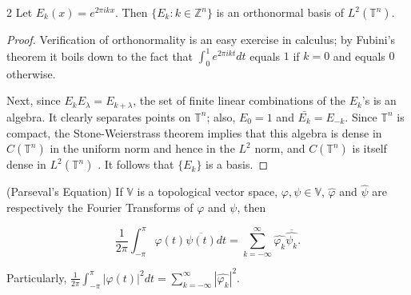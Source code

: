 \begin{theorem}{2 \cite{folland2013real}}
Let $E_{k}(x) = e^{2 \pi i k x}$. Then $\{E_{k} : k \in \mathbb{Z}^{n}\}$ is an orthonormal basis of $L^{2}(\mathbb{T}^{n})$.

\begin{proof}

Verification of orthonormality is an easy exercise in calculus; by Fubini's theorem it boils down to the fact that $\int_{0}^{1}e^{2 \pi i k t}dt$ equals $1$ if $k = 0$ and equals $0$ otherwise.

Next, since $E_{k}E_{\lambda} = E_{k + \lambda}$, the set of finite linear combinations of the $E_{k}$'s is an algebra. It clearly separates points on $\mathbb{T}^{n}$; also, $E_{0} = 1$ and $\bar{E_{k}} = E_{-k}$. Since $\mathbb{T}^{n}$ is compact, the Stone-Weierstrass theorem implies that this algebra is dense in $C(\mathbb{T}^{n})$ in the uniform norm and hence in the $L^{2}$ norm, and $C(\mathbb{T}^{n})$ is itself dense in $L^{2}(\mathbb{T}^{n})$
. It follows that $\{E_{k}\}$ is a basis.

\end{proof}
\end{theorem}
\vspace{0.1in}

\begin{definition}{(Parseval's Equation) \cite{garling2014course}}
If $\mathbb{V}$ is a topological vector space, $\varphi, \psi \in \mathbb{V}$, $\hat{\varphi}$ and $\hat{\psi}$ are respectively the Fourier Transforms of $\varphi$ and $\psi$, then

\[
    \frac{1}{2 \pi} 
    \int_{-\pi}^{\pi} \varphi(t) \overline{\psi(t)}dt = 
    \sum_{k=-\infty}^{\infty} \hat{\varphi_{k}} \overline{\hat{\psi_{k}}}.
\]

\noindent Particularly, $\frac{1}{2 \pi} \int_{-\pi}^{\pi} |\varphi(t)|^{2} dt = \sum_{k=-\infty}^{\infty} |\hat{\varphi_{k}}|^{2}$.

\end{definition}
\vspace{0.1in}

